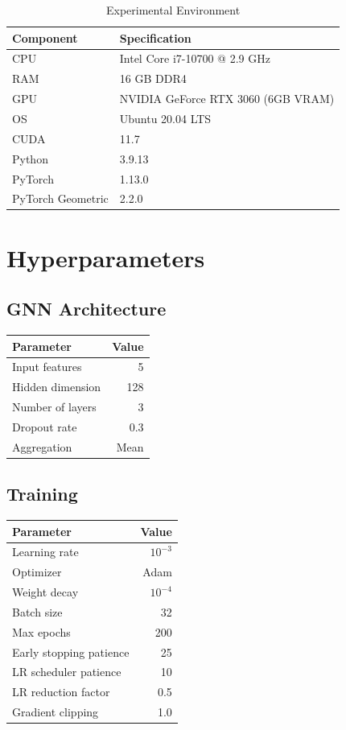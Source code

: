 \begin{table}[H]
\centering
\begin{tabular}{ll}
\toprule
\textbf{Component} & \textbf{Specification} \\
\midrule
CPU & Intel Core i7-10700 @ 2.9 GHz \\
RAM & 16 GB DDR4 \\
GPU & NVIDIA GeForce RTX 3060 (6GB VRAM) \\
OS & Ubuntu 20.04 LTS \\
CUDA & 11.7 \\
Python & 3.9.13 \\
PyTorch & 1.13.0 \\
PyTorch Geometric & 2.2.0 \\
\bottomrule
\end{tabular}
\caption{Experimental Environment}
\end{table}

\section{Hyperparameters}

\subsection{GNN Architecture}
\begin{table}[H]
\centering
\begin{tabular}{lr}
\toprule
\textbf{Parameter} & \textbf{Value} \\
\midrule
Input features & 5 \\
Hidden dimension & 128 \\
Number of layers & 3 \\
Dropout rate & 0.3 \\
Aggregation & Mean \\
\bottomrule
\end{tabular}
\end{table}

\subsection{Training}
\begin{table}[H]
\centering
\begin{tabular}{lr}
\toprule
\textbf{Parameter} & \textbf{Value} \\
\midrule
Learning rate & $10^{-3}$ \\
Optimizer & Adam \\
Weight decay & $10^{-4}$ \\
Batch size & 32 \\
Max epochs & 200 \\
Early stopping patience & 25 \\
LR scheduler patience & 10 \\
LR reduction factor & 0.5 \\
Gradient clipping & 1.0 \\
\bottomrule
\end{tabular}
\end{table}

